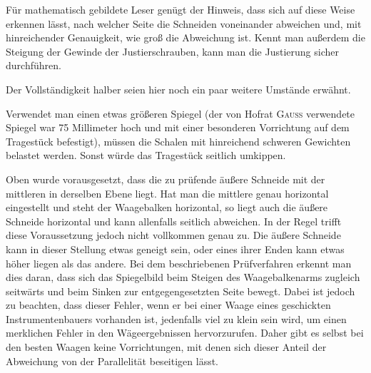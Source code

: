 Für mathematisch gebildete Leser genügt der Hinweis, dass sich auf diese Weise erkennen lässt, nach welcher Seite die Schneiden voneinander abweichen und, mit hinreichender Genauigkeit, wie groß die Abweichung ist. Kennt man außerdem die Steigung der Gewinde der Justierschrauben, kann man die Justierung sicher durchführen.

Der Vollständigkeit halber seien hier noch ein paar weitere Umstände erwähnt.

Verwendet man einen etwas größeren Spiegel (der von Hofrat \textsc{Gauss} verwendete Spiegel war 75 Millimeter hoch und mit einer besonderen Vorrichtung auf dem Tragestück befestigt), müssen die Schalen mit hinreichend schweren Gewichten belastet werden. Sonst würde das Tragestück seitlich umkippen.

Oben wurde vorausgesetzt, dass die zu prüfende äußere Schneide mit der mittleren in derselben Ebene liegt. Hat man die mittlere genau horizontal eingestellt und steht der Waagebalken horizontal, so liegt auch die äußere Schneide horizontal und kann allenfalls seitlich abweichen. In der Regel trifft diese Voraussetzung jedoch nicht vollkommen genau zu. Die äußere Schneide kann in dieser Stellung etwas geneigt sein, oder eines ihrer Enden kann etwas höher liegen als das andere. Bei dem beschriebenen Prüfverfahren erkennt man dies daran, dass sich das Spiegelbild beim Steigen des Waagebalkenarms zugleich seitwärts und beim Sinken zur entgegengesetzten Seite bewegt. Dabei ist jedoch zu beachten, dass dieser Fehler, wenn er bei einer Waage eines geschickten Instrumentenbauers vorhanden ist, jedenfalls viel zu klein sein wird, um einen merklichen Fehler in den Wägeergebnissen hervorzurufen. Daher gibt es selbst bei den besten Waagen keine Vorrichtungen, mit denen sich dieser Anteil der Abweichung von der Parallelität beseitigen lässt.

